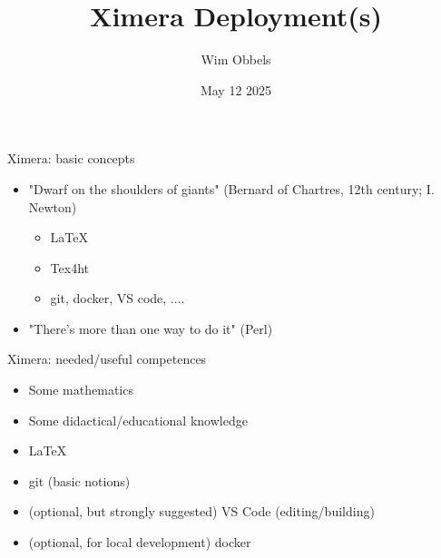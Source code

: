 \usepackage{rawfonts}
%
%
%

\graphicspath{
	{../../}
	{../}
	{./}
  	{../../pictures/}
   	{../pictures/}
   	{./pictures/}
}

\title{Ximera Deployment(s)}
\author{Wim Obbels}
\date{May 12 2025}




\begin{frame}
  \titlepage
\end{frame}


\begin{frame}{Ximera: basic concepts}
  \begin{itemize}[<+->]
    \item "Dwarf on the shoulders of giants" (Bernard of Chartres, 12th century; I. Newton)
    \begin{itemize}[<+->]
      \item \LaTeX
      \item Tex4ht
      \item git, docker, VS code, ....
    \end{itemize}
    \item "There's more than one way to do it" (Perl)
  \end{itemize}
\end{frame}

\begin{frame}{Ximera: needed/useful competences}
  \begin{itemize}[<+->]
    \item Some mathematics
    \item Some didactical/educational knowledge
    \item \LaTeX
    \item git  (basic notions)
    \item (optional, but strongly suggested) VS Code   (editing/building)
    \item (optional, for local development) docker
  \end{itemize}
\end{frame}


